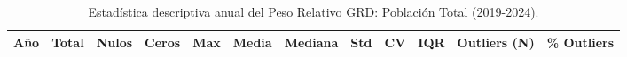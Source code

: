 \begin{table}[htbp]
\centering
\scriptsize
\setlength{\tabcolsep}{2pt}
\renewcommand{\arraystretch}{1.2}
\caption{Estadística descriptiva anual del Peso Relativo GRD: Población Total (2019-2024).}
\label{tab:estadisticas_peso_total}
\begin{tabular}{|c|c|c|c|c|c|c|c|c|c|c|c|}
\hline
\parbox[t]{1cm}{\centering\textbf{Año}} & 
\parbox[t]{1.3cm}{\centering\textbf{Total}} & 
\parbox[t]{1.0cm}{\centering\textbf{Nulos}} & 
\parbox[t]{1.0cm}{\centering\textbf{Ceros}} & 
\parbox[t]{1.1cm}{\centering\textbf{Max}} & 
\parbox[t]{1.0cm}{\centering\textbf{Media}} & 
\parbox[t]{1.2cm}{\centering\textbf{Mediana}} & 
\parbox[t]{1.0cm}{\centering\textbf{Std}} & 
\parbox[t]{1.0cm}{\centering\textbf{CV}} & 
\parbox[t]{1.0cm}{\centering\textbf{IQR}} & 
\parbox[t]{1.5cm}{\centering\textbf{Outliers (N)}} & 
\parbox[t]{1.5cm}{\centering\textbf{\% Outliers}} \\ \hline


\end{tabular}
\end{table}
